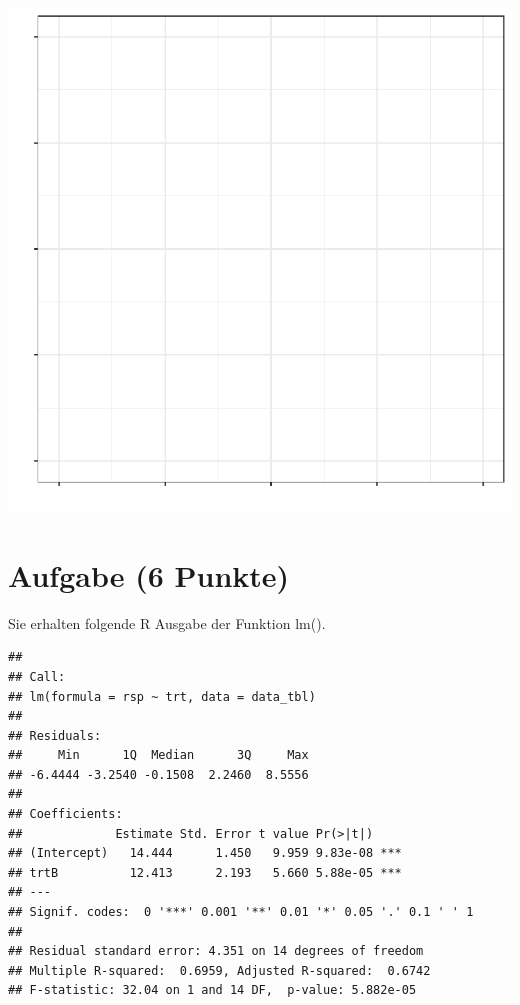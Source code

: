 \documentclass[a4paper, 10pt]{scrartcl}\usepackage[]{graphicx}\usepackage[]{xcolor}
\makeatletter
\def\maxwidth{ %
  \ifdim\Gin@nat@width>\linewidth
    \linewidth
  \else
    \Gin@nat@width
  \fi
}
\newenvironment{kframe}{%
 \def\at@end@of@kframe{}%
 \ifinner\ifhmode%
  \def\at@end@of@kframe{\end{minipage}}%
  \begin{minipage}{\columnwidth}%
 \fi\fi%
 \def\FrameCommand##1{\hskip\@totalleftmargin \hskip-\fboxsep
 \colorbox{shadecolor}{##1}\hskip-\fboxsep
     \hskip-\linewidth \hskip-\@totalleftmargin \hskip\columnwidth}%
 \MakeFramed {\advance\hsize-\width
   \@totalleftmargin\z@ \linewidth\hsize
   \@setminipage}}%
 {\par\unskip\endMakeFramed%
 \at@end@of@kframe}
\newenvironment{knitrout}{}{} %
\makeatother
\begin{document}
{\centering \includegraphics[width=\maxwidth]{img/regression-02-b-1} 

}


 
\clearpage

\section{Aufgabe \hfill (6 Punkte)}

Sie erhalten folgende R Ausgabe der Funktion lm().

\begin{knitrout}
\color{fgcolor}\begin{kframe}
\begin{verbatim}
## 
## Call:
## lm(formula = rsp ~ trt, data = data_tbl)
## 
## Residuals:
##     Min      1Q  Median      3Q     Max 
## -6.4444 -3.2540 -0.1508  2.2460  8.5556 
## 
## Coefficients:
##             Estimate Std. Error t value Pr(>|t|)    
## (Intercept)   14.444      1.450   9.959 9.83e-08 ***
## trtB          12.413      2.193   5.660 5.88e-05 ***
## ---
## Signif. codes:  0 '***' 0.001 '**' 0.01 '*' 0.05 '.' 0.1 ' ' 1
## 
## Residual standard error: 4.351 on 14 degrees of freedom
## Multiple R-squared:  0.6959,	Adjusted R-squared:  0.6742 
## F-statistic: 32.04 on 1 and 14 DF,  p-value: 5.882e-05
\end{verbatim}
\end{kframe}
\end{knitrout}
\end{document}
